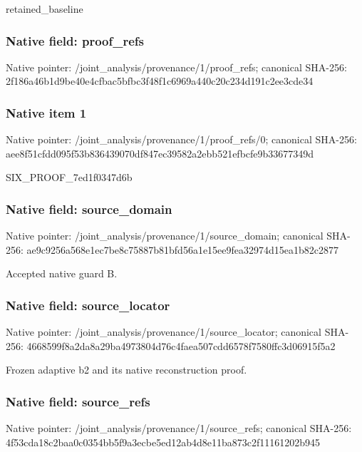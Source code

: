 \documentclass[10pt,a4paper]{article}
\begin{document}
\begingroup\raggedright\sloppy retained\_\allowbreak{}baseline\par\endgroup

\subsubsection{Native field: proof\_\allowbreak{}refs}
Native pointer: /joint\_\allowbreak{}analysis/provenance/1/proof\_\allowbreak{}refs; canonical SHA-256: 2f186a46b1d9be40e4cfbac5bfbc3f48f1c6969a440c20c234d191c2ee3cde34

\subsubsection{Native item 1}
Native pointer: /joint\_\allowbreak{}analysis/provenance/1/proof\_\allowbreak{}refs/0; canonical SHA-256: aee8f51cfdd095f53b836439070df847ec39582a2ebb521efbcfe9b33677349d

\begingroup\raggedright\sloppy SIX\_\allowbreak{}PROOF\_\allowbreak{}7ed1f0347d6b\par\endgroup

\subsubsection{Native field: source\_\allowbreak{}domain}
Native pointer: /joint\_\allowbreak{}analysis/provenance/1/source\_\allowbreak{}domain; canonical SHA-256: ae9c9256a568e1ec7be8c75887b81bfd56a1e15ee9fea32974d15ea1b82c2877

\begingroup\raggedright\sloppy Accepted native guard B.\par\endgroup

\subsubsection{Native field: source\_\allowbreak{}locator}
Native pointer: /joint\_\allowbreak{}analysis/provenance/1/source\_\allowbreak{}locator; canonical SHA-256: 4668599f8a2da8a29ba4973804d76c4faea507cdd6578f7580ffc3d06915f5a2

\begingroup\raggedright\sloppy Frozen adaptive b2 and its native reconstruction proof.\par\endgroup

\subsubsection{Native field: source\_\allowbreak{}refs}
Native pointer: /joint\_\allowbreak{}analysis/provenance/1/source\_\allowbreak{}refs; canonical SHA-256: 4f53cda18c2baa0c0354bb5f9a3ecbe5ed12ab4d8e11ba873c2f11161202b945
\end{document}
